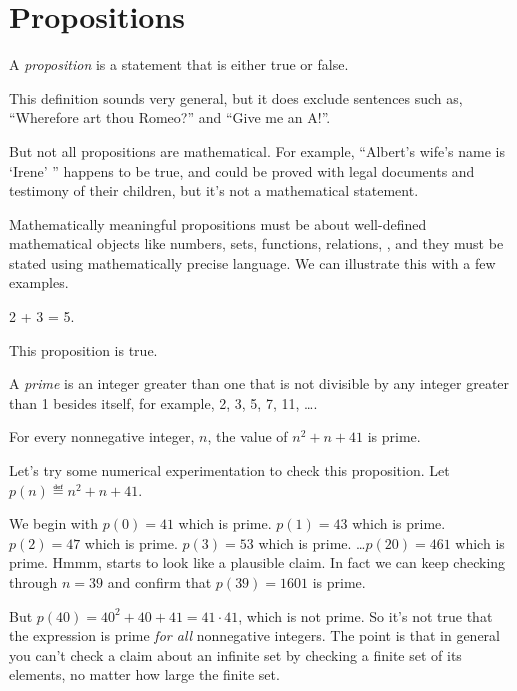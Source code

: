 \section{Propositions}

\begin{definition*}
A {\em proposition} is a statement that is either true or false.
\end{definition*}

This definition sounds very general, but it does exclude sentences
such as, ``Wherefore art thou Romeo?'' and ``Give me an A!''.

But not all propositions are mathematical.  For example, ``Albert's wife's
name is `Irene' '' happens to be true, and could be proved with legal
documents and testimony of their children, but it's not a mathematical
statement.

Mathematically meaningful propositions must be about well-defined
mathematical objects like numbers, sets, functions, relations, \etc, and
they must be stated using mathematically precise language.  We can
illustrate this with a few examples.

\begin{proposition}
2 + 3 = 5.
\end{proposition}

This proposition is true.

A {\em prime} is an integer greater than one that is not divisible by any
integer greater than 1 besides itself, for example, 2, 3, 5, 7, 11, \dots.
\begin{proposition}\label{41}
For every nonnegative integer, $n$, the value of $n^2 + n + 41$ is prime.
\end{proposition}

Let's try some numerical experimentation to check this proposition.
Let $p(n) \eqdef  n^2 + n + 41$.
We begin with $p(0) = 41$ which is prime.  $p(1) = 43$ which is prime.  $p(2) = 47$
which is prime.  $p(3)=53$ which is prime. \dots $p(20) = 461$ which is
prime.  Hmmm, starts to look like a plausible claim.  In fact we can keep
checking through $n=39$ and confirm that $p(39)=1601$ is prime.

But $p(40) = 40^2 + 40 + 41 = 41 \cdot 41$, which is not prime.  So it's
not true that the expression is prime {\em for all} nonnegative integers.
The point is that in general you can't check a claim about an infinite set
by checking a finite set of its elements, no matter how large the finite
set.

